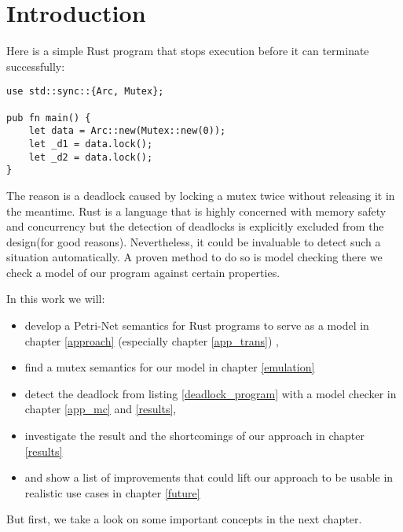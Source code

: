 \chapter{Introduction}
\label{introduction}

Here is a simple Rust\cite{klabnik2018rust} program that stops execution before it can terminate successfully:

\begin{lstlisting}
use std::sync::{Arc, Mutex};

pub fn main() {
    let data = Arc::new(Mutex::new(0));
    let _d1 = data.lock();
    let _d2 = data.lock();
}
\end{lstlisting}
The reason is a deadlock caused by locking a mutex twice without releasing it in the meantime.
Rust is a language that is highly concerned with memory safety and concurrency\cite{Matsakis:2014:RL:2692956.2663188} but the detection of deadlocks is explicitly excluded from the design\cite[Chapter 8.1]{nomicon}(for good reasons).
Nevertheless, it could be invaluable to detect such a situation automatically.
A proven method to do so is model checking\cite{baier2008principles} there we check a model of our program against certain properties.

In this work we will:
\begin{itemize}
    \item develop a Petri-Net\cite{petri1962kommunikation} semantics for Rust programs to serve as a model in chapter \ref{approach} (especially chapter \ref{app_trans}) ,
    \item find a mutex semantics for our model in chapter \ref{emulation}
    \item detect the deadlock from listing \ref{deadlock_program} with a model checker in chapter \ref{app_mc} and \ref{results},
    \item investigate the result and the shortcomings of our approach in chapter \ref{results}
    \item and show a list of improvements that could lift our approach to be usable in realistic use cases in chapter \ref{future}
\end{itemize}
But first, we take a look on some important concepts in the next chapter.